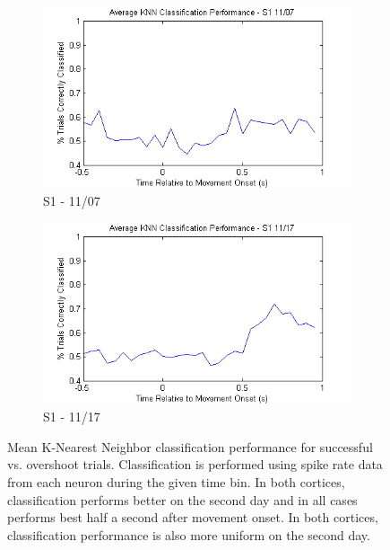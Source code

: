 \documentclass[11pt,a4paper]{article}
\begin{document}
\begin{figure}[h]
{\begin{subfigure}[b]{0.75\textwidth}
                \includegraphics[width=\textwidth]{knn-s1-07}
                \caption{\large S1 - 11/07 \\}
                \label{fig:knn-s1-07}
        \end{subfigure}
        \begin{subfigure}[b]{0.75\textwidth}
                \centering
                \includegraphics[width=\textwidth]{knn-s1-17}
                \caption{\large S1 - 11/17 \\}
                \label{fig:knn-s1-17}
        \end{subfigure}}
        \caption{Mean K-Nearest Neighbor classification performance for successful vs. overshoot trials. Classification is performed using spike rate data from each neuron during the given time bin. In both cortices, classification performs better on the second day and in all cases performs best half a second after movement onset. In both cortices, classification performance is also more uniform on the second day.}\label{fig:knn-21}
\end{figure}
\end{document}
